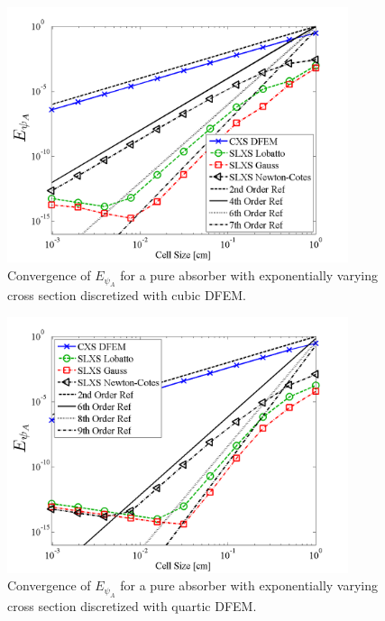 %
\begin{figure}[!htp]
\centering
\includegraphics[width=10cm]{chapter3_variable_xs/P3_VarXS_E_psi_A.png}
\caption{Convergence of $E_{\psi_A}$  for a pure absorber with exponentially varying cross section discretized with cubic DFEM.}
\label{fig:varxs_psi_A_p3}
\end{figure}
%
%
\begin{figure}[!hbp]
\centering
\includegraphics[width=10cm]{chapter3_variable_xs/P4_VarXS_E_psi_A.png}
\caption{Convergence of $E_{\psi_A}$  for a pure absorber with exponentially varying cross section discretized with quartic DFEM.}
\label{fig:varxs_psi_A_p4}
\end{figure}
%


